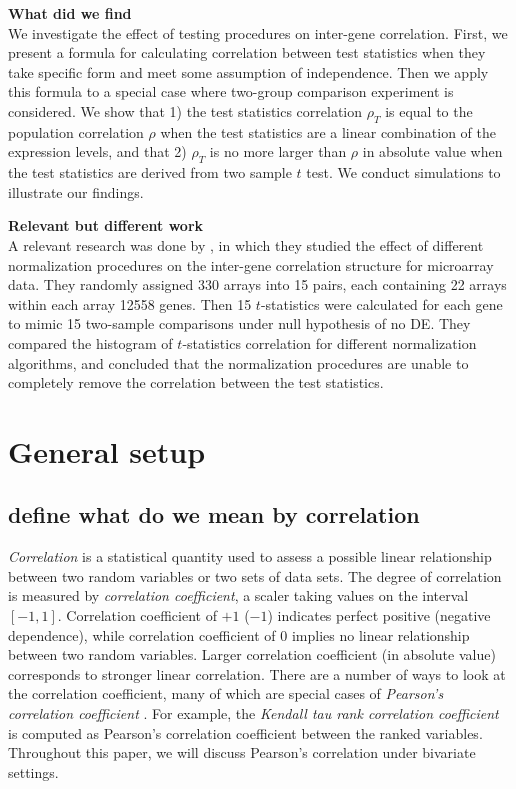 \documentclass[12pt, a4paper]{article}
\begin{document}
	
		\textbf{What did we find}\\
	We investigate the effect of testing procedures on inter-gene correlation. First, we present a 
	formula for calculating correlation between test statistics when they take specific form and 
	meet some assumption of independence. Then we apply this formula to a special case where 
	two-group comparison experiment is considered. We show that 1) the test statistics correlation 
	$\rho_T$ is equal to the population correlation $\rho$ when the test statistics are a linear 
	combination of the expression levels, and that 2) $\rho_T$ is no more larger than $\rho$ in 
	absolute value when the test statistics are derived from two sample $t$ test. We conduct 
	simulations to illustrate our findings.
		
	
	\textbf{Relevant but different work}\\
	A relevant research was done by \citet{qiu2005effects}, in which they studied the effect of different
	normalization procedures on the inter-gene correlation structure for microarray data. They randomly
	assigned 330 arrays into 15 pairs, each containing 22 arrays within each array 12558 genes. Then 15
	$t$-statistics were calculated for each gene to mimic 15 two-sample comparisons under null
	hypothesis of no DE. They compared the histogram of $t$-statistics correlation for different
	normalization algorithms, and concluded that the normalization procedures are unable to completely
	remove the correlation between the test statistics. %
	

	
	
	
	
	
	\section{General setup}
	
	\subsection{define what do we mean by correlation}
	\textit{Correlation} is a statistical quantity used to assess a possible linear relationship between two random variables or two sets of 
	data sets. The degree of correlation is measured by \textit{correlation coefficient}, a scaler taking values on the interval $[-1, 1]$. 
	Correlation coefficient of $+1$ ($-1$) indicates perfect positive (negative dependence), while correlation coefficient of 0 implies no linear 
	relationship between two random variables. Larger correlation coefficient (in absolute value) corresponds to stronger linear correlation. 
	There are a number of ways to look at the correlation coefficient, many of which are special 
	cases of \textit{Pearson's correlation coefficient} 
	\citep{lee1988thirteen}. For example, the \textit{Kendall tau rank correlation coefficient} is 
	computed as Pearson's correlation coefficient between the ranked variables. Throughout this 
	paper, we will discuss Pearson's correlation under bivariate settings. 
	 
\end{document}
